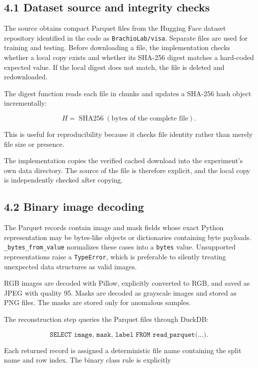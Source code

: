 \documentclass[
  11pt,
]{article}
\begin{document}
\subsection{4.1 Dataset source and integrity
checks}\label{dataset-source-and-integrity-checks}

The source obtains compact Parquet files from the Hugging Face dataset
repository identified in the code as \texttt{BrachioLab/visa}. Separate
files are used for training and testing. Before downloading a file, the
implementation checks whether a local copy exists and whether its
SHA-256 digest matches a hard-coded expected value. If the local digest
does not match, the file is deleted and redownloaded.

The digest function reads each file in chunks and updates a SHA-256 hash
object incrementally:

\[
H
=
\operatorname{SHA256}
\left(
\text{bytes of the complete file}
\right).
\]

This is useful for reproducibility because it checks file identity
rather than merely file size or presence.

The implementation copies the verified cached download into the
experiment's own data directory. The source of the file is therefore
explicit, and the local copy is independently checked after copying.

\subsection{4.2 Binary image decoding}\label{binary-image-decoding}

The Parquet records contain image and mask fields whose exact Python
representation may be bytes-like objects or dictionaries containing byte
payloads. \texttt{\_bytes\_from\_value} normalizes these cases into a
\texttt{bytes} value. Unsupported representations raise a
\texttt{TypeError}, which is preferable to silently treating unexpected
data structures as valid images.

RGB images are decoded with Pillow, explicitly converted to RGB, and
saved as JPEG with quality 95. Masks are decoded as grayscale images and
stored as PNG files. The masks are stored only for anomalous samples.

The reconstruction step queries the Parquet files through DuckDB:

\[
\texttt{SELECT image, mask, label FROM read\_parquet(...)}.
\]

Each returned record is assigned a deterministic file name containing
the split name and row index. The binary class rule is explicitly
\end{document}
